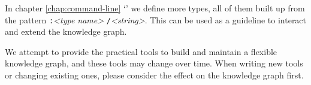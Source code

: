   In chapter \ref{chap:command-line}
  {\color{LinkGray}`'} we define more types,
  all of them built up from the pattern \texttt{:}\emph{<type name>}%
  \texttt{/}\emph{<string>}.  This can be used as a guideline to interact
  and extend the knowledge graph.

  We attempt to provide the practical tools to build and maintain a flexible
  knowledge graph, and these tools may change over time.  When writing new
  tools or changing existing ones, please consider the effect on the knowledge
  graph first.
